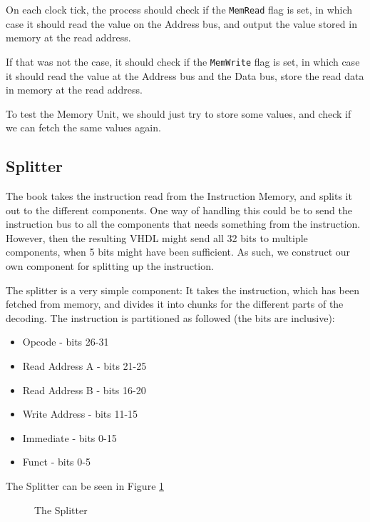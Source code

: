 On each clock tick, the process should check if the \texttt{MemRead} flag is
set, in which case it should read the value on the Address bus, and output the
value stored in memory at the read address.

If that was not the case, it should check if the \texttt{MemWrite} flag is set,
in which case it should read the value at the Address bus and the Data bus,
store the read data in memory at the read address.

To test the Memory Unit, we should just try to store some values, and check if
we can fetch the same values again.

\subsection{Splitter}
The book\cite{ref:ark} takes the instruction read from the Instruction Memory,
and splits it out to the different components. One way of handling this could
be to send the instruction bus to all the components that needs something from
the instruction. However, then the resulting VHDL might send all 32 bits to
multiple components, when 5 bits might have been sufficient. As such, we
construct our own component for splitting up the instruction.

The splitter is a very simple component: It takes the instruction, which has
been fetched from memory, and divides it into chunks for the different parts of
the decoding. The instruction is partitioned as followed (the bits are
inclusive):
\begin{itemize}
    \item Opcode - bits 26-31
    \item Read Address A - bits 21-25
    \item Read Address B - bits 16-20
    \item Write Address - bits 11-15
    \item Immediate - bits 0-15
    \item Funct - bits 0-5
\end{itemize}
The Splitter can be seen in Figure \ref{fig:split}
\begin{figure}
    \centering
    \caption{The Splitter}
    \label{fig:split}
\end{figure}

